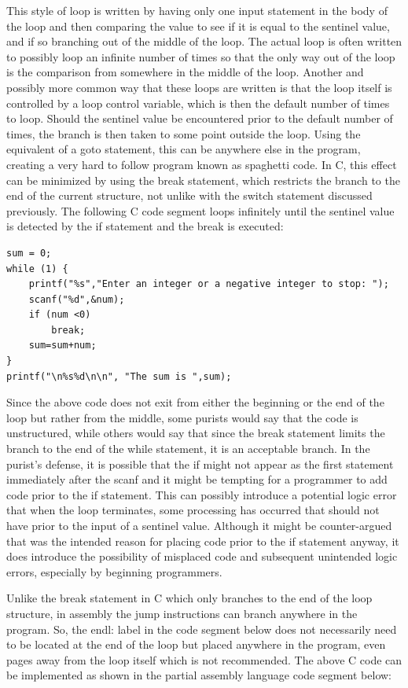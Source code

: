 \documentclass[10pt]{book}
\begin{document}
This style of loop is written by having only one input statement in the body of the loop and then comparing the value to see if it is equal to the sentinel value, and if so branching out of the middle of the loop. The actual loop is often written to possibly loop an infinite number of times so that the only way out of the loop is the comparison from somewhere in the middle of the loop. Another and possibly more common way that these loops are written is that the loop itself is controlled by a loop control variable, which is then the default number of times to loop. Should the sentinel value be encountered prior to the default number of times, the branch is then taken to some point outside the loop. Using the equivalent of a goto statement, this can be anywhere else in the program, creating a very hard to follow program known as spaghetti code. In C, this effect can be minimized by using the break statement, which restricts the branch to the end of the current structure, not unlike with the switch statement discussed previously. The following C code segment loops infinitely until the sentinel value is detected by the if statement and the break is executed:

\begin{verbatim}
sum = 0;
while (1) {
    printf("%s","Enter an integer or a negative integer to stop: ");
    scanf("%d",&num);
    if (num <0)
        break;
    sum=sum+num;
}
printf("\n%s%d\n\n", "The sum is ",sum);
\end{verbatim}

Since the above code does not exit from either the beginning or the end of the loop but rather from the middle, some purists would say that the code is unstructured, while others would say that since the break statement limits the branch to the end of the while statement, it is an acceptable branch. In the purist's defense, it is possible that the if might not appear as the first statement immediately after the scanf and it might be tempting for a programmer to add code prior to the if statement. This can possibly introduce a potential logic error that when the loop terminates, some processing has occurred that should not have prior to the input of a sentinel value. Although it might be counter-argued that was the intended reason for placing code prior to the if statement anyway, it does introduce the possibility of misplaced code and subsequent unintended logic errors, especially by beginning programmers.


Unlike the break statement in C which only branches to the end of the loop structure, in assembly the jump instructions can branch anywhere in the program. So, the endl: label in the code segment below does not necessarily need to be located at the end of the loop but placed anywhere in the program, even pages away from the loop itself which is not recommended. The above C code can be implemented as shown in the partial assembly language code segment below:
\end{document}
